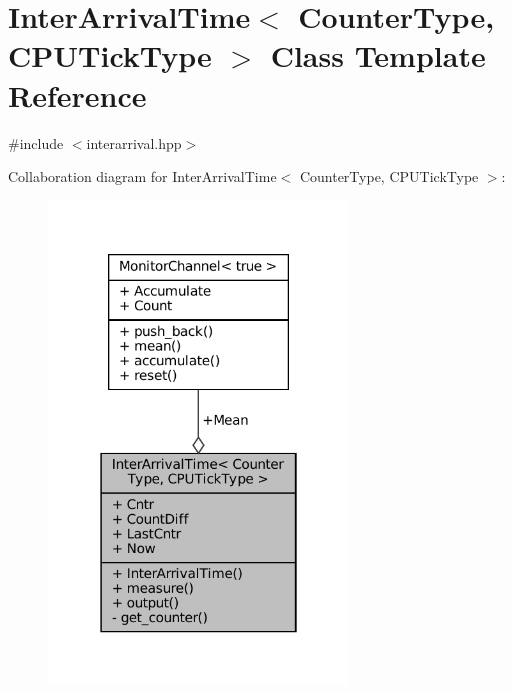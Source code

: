 \hypertarget{classInterArrivalTime}{}\section{Inter\+Arrival\+Time$<$ Counter\+Type, C\+P\+U\+Tick\+Type $>$ Class Template Reference}
\label{classInterArrivalTime}


{\ttfamily \#include $<$interarrival.\+hpp$>$}



Collaboration diagram for Inter\+Arrival\+Time$<$ Counter\+Type, C\+P\+U\+Tick\+Type $>$\+:
\nopagebreak
\begin{figure}[H]
\begin{center}
\leavevmode
\includegraphics[width=226pt]{d1/d32/classInterArrivalTime__coll__graph}
\end{center}
\end{figure}
